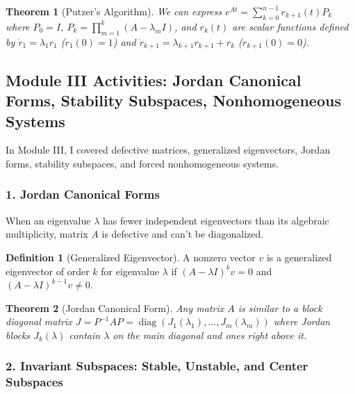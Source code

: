 \documentclass[12pt,a4paper,oneside]{article}
\theoremstyle{definition}
\newtheorem{definition}{Definition}[section]
\theoremstyle{plain}
\newtheorem{theorem}{Theorem}[section]
\begin{document}
\vspace{0.15cm}
\begin{theorem}[Putzer's Algorithm]
We can express $e^{At} = \sum_{k=0}^{n-1} r_{k+1}(t) P_k$ where $P_0 = I$, $P_k = \prod_{m=1}^k (A - \lambda_m I)$, and $r_k(t)$ are scalar functions defined by $\dot{r}_1 = \lambda_1 r_1$ ($r_1(0)=1$) and $\dot{r}_{k+1} = \lambda_{k+1} r_{k+1} + r_k$ ($r_{k+1}(0)=0$).
\end{theorem}

\subsection{Module III Activities: Jordan Canonical Forms, Stability Subspaces, Nonhomogeneous Systems}

In Module III, I covered defective matrices, generalized eigenvectors, Jordan forms, stability subspaces, and forced nonhomogeneous systems.

\subsubsection{1. Jordan Canonical Forms}

\vspace{0.15cm}
When an eigenvalue $\lambda$ has fewer independent eigenvectors than its algebraic multiplicity, matrix $A$ is defective and can't be diagonalized.

\begin{definition}[Generalized Eigenvector]
A nonzero vector $v$ is a generalized eigenvector of order $k$ for eigenvalue $\lambda$ if $(A - \lambda I)^k v = 0$ and $(A - \lambda I)^{k-1} v \neq 0$.
\end{definition}

\begin{theorem}[Jordan Canonical Form]
Any matrix $A$ is similar to a block diagonal matrix $J = P^{-1} A P = \operatorname{diag}(J_1(\lambda_1), \dots, J_m(\lambda_m))$ where Jordan blocks $J_k(\lambda)$ contain $\lambda$ on the main diagonal and ones right above it.
\end{theorem}

\subsubsection{2. Invariant Subspaces: Stable, Unstable, and Center Subspaces}
\end{document}
